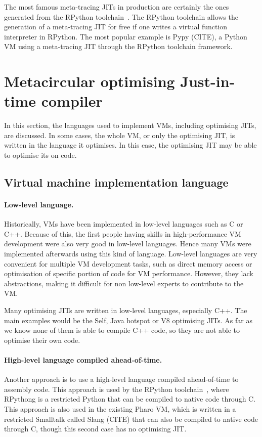 \documentclass[a4paper,12pt,twoside]{../includes/ThesisStyle}
\begin{document}
The most famous meta-tracing JITs in production are certainly the ones generated from the RPython toolchain~\cite{Rigo06a}. The RPython toolchain allows the generation of a meta-tracing JIT for free if one writes a virtual function interpreter in RPython. The most popular example is Pypy (CITE), a Python VM using a meta-tracing JIT through the RPython toolchain framework.


\section{Metacircular optimising Just-in-time compiler}
\label{sec:implLang}

In this section, the languages used to implement VMs, including optimising JITs, are discussed. In some cases, the whole VM, or only the optimising JIT, is written in the language it optimises. In this case, the optimising JIT may be able to optimise its on code.

\subsection{Virtual machine implementation language}

\paragraph{Low-level language.}
Historically, VMs have been implemented in low-level languages such as C or C++. Because of this, the first people having skills in high-performance VM development were also very good in low-level languages. Hence many VMs were implemented afterwards using this kind of language. Low-level languages are very convenient for multiple VM development tasks, such as direct memory access or optimisation of specific portion of code for VM performance. However, they lack abstractions, making it difficult for non low-level experts to contribute to the VM.

Many optimising JITs are written in low-level languages, especially C++. The main examples would be the Self, Java hotspot or V8 optimising JITs. As far as we know none of them is able to compile C++ code, so they are not able to optimise their own code.

\paragraph{High-level language compiled ahead-of-time.}
Another approach is to use a high-level language compiled ahead-of-time to assembly code. This approach is used by the RPython toolchain~\cite{Rigo06a}, where RPythong is a restricted Python that can be compiled to native code through C. This approach is also used in the existing Pharo VM, which is written in a restricted Smalltalk called Slang (CITE) that can also be compiled to native code through C, though this second case has no optimising JIT.
\end{document}
